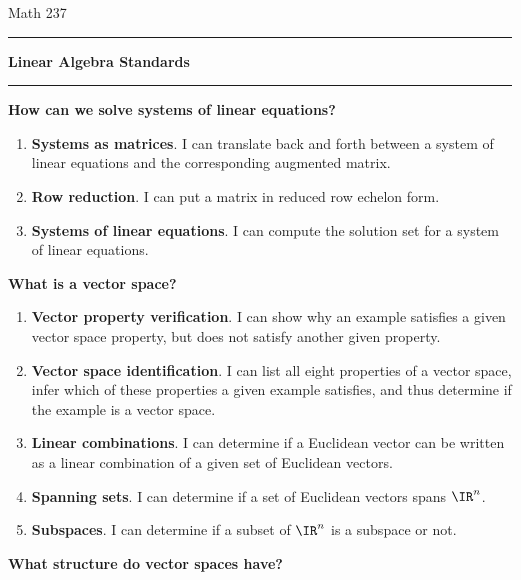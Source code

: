 
\usepackage[left=1in,right=1in,top=1in,bottom=1in]{geometry}
\usepackage{enumerate,amssymb}


\pagestyle{empty}
\noindent Math 237 \hfill \sem \hfill \prof
\vspace{0.3in}
\hrule
\begin{center}{\large \bf Linear Algebra Standards}\end{center}
\hrule

\begin{multicols}{2}
\noindent\textbf{How can we solve systems of linear equations?}
\begin{enumerate}
\item {\bf Systems as matrices}. I can translate back and forth between a system of linear equations and the corresponding augmented matrix.
\item {\bf Row reduction}.  I can put a matrix in reduced row echelon form.
\item {\bf Systems of linear equations}. I can compute the solution set for a system of linear equations.
\end{enumerate}

\noindent\textbf{What is a vector space?}
\begin{enumerate}
\item {\bf Vector property verification}. I can show why an example satisfies a given vector space property, but does not satisfy another given property.
\item {\bf Vector space identification}. I can list all eight properties of a vector space, infer which of these properties a given example satisfies, and thus determine if the example is a vector space.
\item {\bf Linear combinations}. I can determine if a Euclidean vector can be written as a linear combination of a given set of Euclidean vectors.
\item {\bf Spanning sets}. I can determine if a set of Euclidean vectors spans \(\IR^n\).
\item {\bf Subspaces}. I can determine if a subset of \(\IR^n\) is a subspace or not.

\end{enumerate}

\noindent\textbf{What structure do vector spaces have?}
\begin{enumerate}


\end{enumerate}
\end{multicols}
